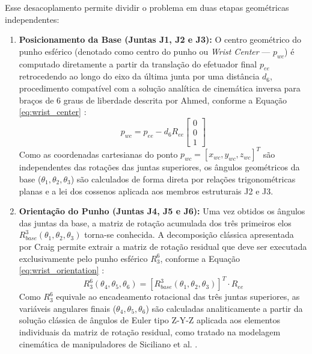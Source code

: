 Esse desacoplamento permite dividir o problema em duas etapas geométricas independentes:
\begin{enumerate}
    \item \textbf{Posicionamento da Base (Juntas J1, J2 e J3):} O centro geométrico do punho esférico (denotado como centro do punho ou \textit{Wrist Center} --- $p_{wc}$) é computado diretamente a partir da translação do efetuador final $p_{ee}$ retrocedendo ao longo do eixo da última junta por uma distância $d_6$, procedimento compatível com a solução analítica de cinemática inversa para braços de 6 graus de liberdade descrita por Ahmed, conforme a Equação \ref{eq:wrist_center} \cite{ahmed2022inverse}:
    \begin{equation}
    \label{eq:wrist_center}
    p_{wc} = p_{ee} - d_6 R_{ee} \begin{bmatrix} 0 \\ 0 \\ 1 \end{bmatrix}
    \end{equation}
    Como as coordenadas cartesianas do ponto $p_{wc} = [x_{wc}, y_{wc}, z_{wc}]^T$ são independentes das rotações das juntas superiores, os ângulos geométricos da base ($\theta_1, \theta_2, \theta_3$) são calculados de forma direta por relações trigonométricas planas e a lei dos cossenos aplicada aos membros estruturais J2 e J3.
    
    \item \textbf{Orientação do Punho (Juntas J4, J5 e J6):} Uma vez obtidos os ângulos das juntas da base, a matriz de rotação acumulada dos três primeiros elos $R_{base}^3(\theta_1, \theta_2, \theta_3)$ torna-se conhecida. A decomposição clássica apresentada por Craig permite extrair a matriz de rotação residual que deve ser executada exclusivamente pelo punho esférico $R_3^6$, conforme a Equação \ref{eq:wrist_orientation} \cite{craig2005introduction}:
    \begin{equation}
    \label{eq:wrist_orientation}
    R_3^6(\theta_4, \theta_5, \theta_6) = [R_{base}^3(\theta_1, \theta_2, \theta_3)]^T \cdot R_{ee}
    \end{equation}
    Como $R_3^6$ equivale ao encadeamento rotacional das três juntas superiores, as variáveis angulares finais ($\theta_4, \theta_5, \theta_6$) são calculadas analiticamente a partir da solução clássica de ângulos de Euler tipo Z-Y-Z aplicada aos elementos individuais da matriz de rotação residual, como tratado na modelagem cinemática de manipuladores de Siciliano et al. \cite{siciliano2009robotics}. 
\end{enumerate}

